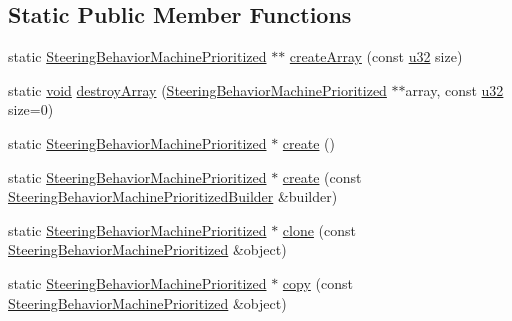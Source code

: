 \subsection*{Static Public Member Functions}
\begin{DoxyCompactItemize}
\item 
static \mbox{\hyperlink{classnjli_1_1_steering_behavior_machine_prioritized}{Steering\+Behavior\+Machine\+Prioritized}} $\ast$$\ast$ \mbox{\hyperlink{classnjli_1_1_steering_behavior_machine_prioritized_aa0bbfb3b91471a27b5c892fd437d2c09}{create\+Array}} (const \mbox{\hyperlink{_util_8h_a10e94b422ef0c20dcdec20d31a1f5049}{u32}} size)
\item 
static \mbox{\hyperlink{_thread_8h_af1e856da2e658414cb2456cb6f7ebc66}{void}} \mbox{\hyperlink{classnjli_1_1_steering_behavior_machine_prioritized_a8d2c77293eaf78e3b039be7848113845}{destroy\+Array}} (\mbox{\hyperlink{classnjli_1_1_steering_behavior_machine_prioritized}{Steering\+Behavior\+Machine\+Prioritized}} $\ast$$\ast$array, const \mbox{\hyperlink{_util_8h_a10e94b422ef0c20dcdec20d31a1f5049}{u32}} size=0)
\item 
static \mbox{\hyperlink{classnjli_1_1_steering_behavior_machine_prioritized}{Steering\+Behavior\+Machine\+Prioritized}} $\ast$ \mbox{\hyperlink{classnjli_1_1_steering_behavior_machine_prioritized_a941f586892a65e7cd31603a12203a307}{create}} ()
\item 
static \mbox{\hyperlink{classnjli_1_1_steering_behavior_machine_prioritized}{Steering\+Behavior\+Machine\+Prioritized}} $\ast$ \mbox{\hyperlink{classnjli_1_1_steering_behavior_machine_prioritized_a0e75da87a00d1c8feb82a444eedb599d}{create}} (const \mbox{\hyperlink{classnjli_1_1_steering_behavior_machine_prioritized_builder}{Steering\+Behavior\+Machine\+Prioritized\+Builder}} \&builder)
\item 
static \mbox{\hyperlink{classnjli_1_1_steering_behavior_machine_prioritized}{Steering\+Behavior\+Machine\+Prioritized}} $\ast$ \mbox{\hyperlink{classnjli_1_1_steering_behavior_machine_prioritized_a5b86567620dab0bd1a238c222efcfd63}{clone}} (const \mbox{\hyperlink{classnjli_1_1_steering_behavior_machine_prioritized}{Steering\+Behavior\+Machine\+Prioritized}} \&object)
\item 
static \mbox{\hyperlink{classnjli_1_1_steering_behavior_machine_prioritized}{Steering\+Behavior\+Machine\+Prioritized}} $\ast$ \mbox{\hyperlink{classnjli_1_1_steering_behavior_machine_prioritized_a639b1ed7827dcf456f205d635632ae5f}{copy}} (const \mbox{\hyperlink{classnjli_1_1_steering_behavior_machine_prioritized}{Steering\+Behavior\+Machine\+Prioritized}} \&object)

\end{DoxyCompactItemize}

